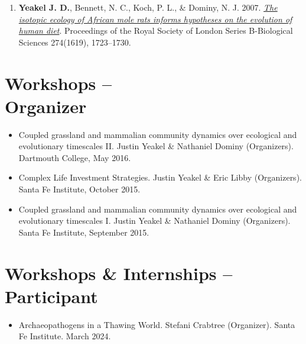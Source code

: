 \documentclass[margin,line,12pt]{res}
\begin{document}
\begin{resume}
\begin{enumerate}
\item \textbf{Yeakel J. D.}, Bennett, N. C., Koch, P. L., \& Dominy, N. J. 2007. \href{https://royalsocietypublishing.org/doi/10.1098/rspb.2007.0330}{\emph{The isotopic ecology of African mole rats informs hypotheses on the evolution of human diet}}. Proceedings of the Royal Society of London Series B-Biological Sciences 274(1619), 1723–1730.

\end{enumerate}

%
%


\section{\sc Workshops -- \\ Organizer}
\begin{itemize}
\item Coupled grassland and mammalian community dynamics over ecological and evolutionary timescales II. Justin Yeakel \& Nathaniel Dominy (Organizers). Dartmouth College, May 2016.

\item Complex Life Investment Strategies. Justin Yeakel \& Eric Libby (Organizers). Santa Fe Institute, October 2015.

\item Coupled grassland and mammalian community dynamics over ecological and evolutionary timescales I. Justin Yeakel \& Nathaniel Dominy (Organizers). Santa Fe Institute, September 2015.
\end{itemize}


\section{\sc Workshops \& Internships -- \\ Participant}
\begin{itemize}
\item Archaeopathogens in a Thawing World. Stefani Crabtree (Organizer). Santa Fe Institute. March 2024.


\end{itemize}
\end{resume}
\end{document}
